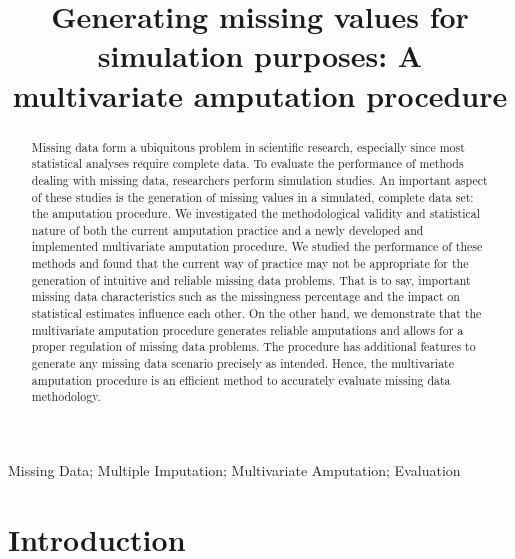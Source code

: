 \documentclass[]{interact}
\begin{document}
\title{\LARGE\bf Generating missing values for simulation purposes: A multivariate amputation procedure}
\maketitle
\author{
}

\begin{abstract}
Missing data form a ubiquitous problem in scientific research, especially since most statistical analyses require complete data. To evaluate the performance of methods dealing with missing data, researchers perform simulation studies. An important aspect of these studies is the generation of missing values in a simulated, complete data set: the amputation procedure. We investigated the methodological validity and statistical nature of both the current amputation practice and a newly developed and implemented multivariate amputation procedure. We studied the performance of these methods and found that the current way of practice may not be appropriate for the generation of intuitive and reliable missing data problems. That is to say, important missing data characteristics such as the missingness percentage and the impact on statistical estimates influence each other. On the other hand, we demonstrate that the multivariate amputation procedure generates reliable amputations and allows for a proper regulation of missing data problems. The procedure has additional features to generate any missing data scenario precisely as intended. Hence, the multivariate amputation procedure is an efficient method to accurately evaluate missing data methodology.
\end{abstract}

\begin{keywords}
Missing Data; Multiple Imputation; Multivariate Amputation; Evaluation
\end{keywords}

\section{Introduction}
\end{document}
